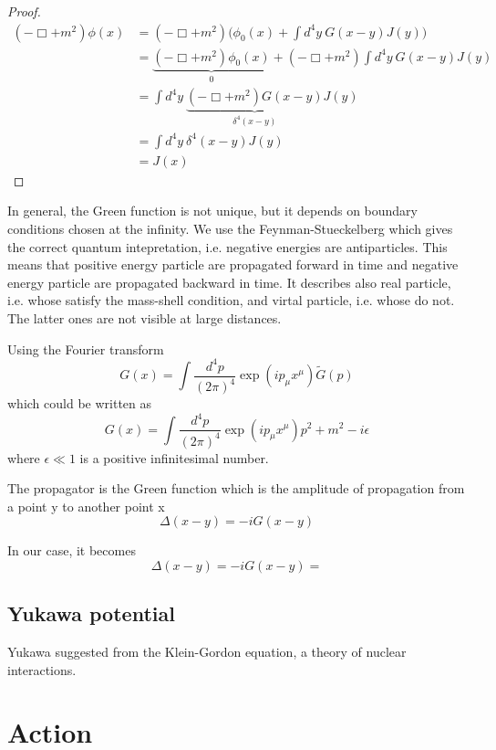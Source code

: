     \begin{proof}
        \begin{equation*}
        \begin{aligned}
            (- \Box + m^2) \phi(x) & =  (- \Box + m^2) \Big (\phi_0 (x) + \int d^4y ~ G(x-y) J (y) \Big ) \\ & = \underbrace{(- \Box + m^2) \phi_0 (x)}_0 + (- \Box + m^2) \int d^4y ~ G(x-y) J (y) \\ & =  \int d^4y ~ \underbrace{(- \Box + m^2) G(x-y)}_{\delta^4(x-y)} J (y) \\ & = \int d^4 y ~ \delta^4(x-y) J(y) \\ & = J(x)
        \end{aligned}
        \end{equation*}
    \end{proof}

    In general, the Green function is not unique, but it depends on boundary conditions chosen at the infinity. We use the Feynman-Stueckelberg which gives the correct quantum intepretation, i.e. negative energies are antiparticles. This means that positive energy particle are propagated forward in time and negative energy particle are propagated backward in time. It describes also real particle, i.e. whose satisfy the mass-shell condition, and virtal particle, i.e. whose do not. The latter ones are not visible at large distances.  

    Using the Fourier transform 
    \begin{equation*}
        G(x) = \int \frac{d^4 p}{(2\pi)^4} \exp(i p_\mu x^\mu) \tilde G(p)
    \end{equation*}
    which could be written as 
    \begin{equation*}
        G(x) = \int \frac{d^4 p}{(2\pi)^4} {\exp(i p_\mu x^\mu)}{p^2 + m^2 - i \epsilon}
    \end{equation*}
    where $\epsilon \ll 1$ is a positive infinitesimal number.

    The propagator is the Green function which is the amplitude of propagation from a point y to another point x
    \begin{equation*}
        \Delta (x - y) = - i G(x - y)
    \end{equation*}

    In our case, it becomes 
    \begin{equation}
        \Delta (x - y) = - i G(x - y) = 
    \end{equation}




    \section{Yukawa potential}
    
    Yukawa suggested from the Klein-Gordon equation, a theory of nuclear interactions.



\chapter{Action}


